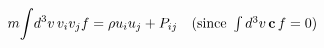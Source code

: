 \documentclass[preview]{standalone}
\begin{document}
\begin{align*}
\special{dvisvgm:raw <g id='unique000'>}m\!\int\! d^3v\,v_iv_jf=\rho u_iu_j+P_{ij}\quad(\text{since }\textstyle\int d^3v\,\va c\,f=0)\special{dvisvgm:raw </g>}
\end{align*}
\end{document}

